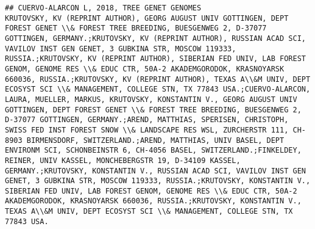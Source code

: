 \documentclass[]{article}
\begin{document}
\begin{verbatim}
## CUERVO-ALARCON L, 2018, TREE GENET GENOMES                                                              KRUTOVSKY, KV (REPRINT AUTHOR), GEORG AUGUST UNIV GOTTINGEN, DEPT FOREST GENET \\& FOREST TREE BREEDING, BUESGENWEG 2, D-37077 GOTTINGEN, GERMANY.;KRUTOVSKY, KV (REPRINT AUTHOR), RUSSIAN ACAD SCI, VAVILOV INST GEN GENET, 3 GUBKINA STR, MOSCOW 119333, RUSSIA.;KRUTOVSKY, KV (REPRINT AUTHOR), SIBERIAN FED UNIV, LAB FOREST GENOM, GENOME RES \\& EDUC CTR, 50A-2 AKADEMGORODOK, KRASNOYARSK 660036, RUSSIA.;KRUTOVSKY, KV (REPRINT AUTHOR), TEXAS A\\&M UNIV, DEPT ECOSYST SCI \\& MANAGEMENT, COLLEGE STN, TX 77843 USA.;CUERVO-ALARCON, LAURA, MUELLER, MARKUS, KRUTOVSKY, KONSTANTIN V., GEORG AUGUST UNIV GOTTINGEN, DEPT FOREST GENET \\& FOREST TREE BREEDING, BUESGENWEG 2, D-37077 GOTTINGEN, GERMANY.;AREND, MATTHIAS, SPERISEN, CHRISTOPH, SWISS FED INST FOREST SNOW \\& LANDSCAPE RES WSL, ZURCHERSTR 111, CH-8903 BIRMENSDORF, SWITZERLAND.;AREND, MATTHIAS, UNIV BASEL, DEPT ENVIRONM SCI, SCHONBEINSTR 6, CH-4056 BASEL, SWITZERLAND.;FINKELDEY, REINER, UNIV KASSEL, MONCHEBERGSTR 19, D-34109 KASSEL, GERMANY.;KRUTOVSKY, KONSTANTIN V., RUSSIAN ACAD SCI, VAVILOV INST GEN GENET, 3 GUBKINA STR, MOSCOW 119333, RUSSIA.;KRUTOVSKY, KONSTANTIN V., SIBERIAN FED UNIV, LAB FOREST GENOM, GENOME RES \\& EDUC CTR, 50A-2 AKADEMGORODOK, KRASNOYARSK 660036, RUSSIA.;KRUTOVSKY, KONSTANTIN V., TEXAS A\\&M UNIV, DEPT ECOSYST SCI \\& MANAGEMENT, COLLEGE STN, TX 77843 USA.

\end{verbatim}
\end{document}
